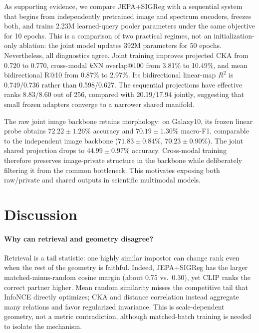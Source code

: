 \documentclass{article}
\begin{document}
As supporting evidence, we compare JEPA+SIGReg with a sequential system that begins from independently pretrained image and spectrum encoders, freezes both, and trains 2.23M learned-query pooler parameters under the same objective for 10 epochs.
This is a comparison of two practical regimes, not an initialization-only ablation: the joint model updates 392M parameters for 50 epochs.
Nevertheless, all diagnostics agree.
Joint training improves projected CKA from 0.720 to 0.770, cross-modal $k$NN overlap@100 from 3.81\% to 10.49\%, and mean bidirectional R@10 from 0.87\% to 2.97\%.
Its bidirectional linear-map $R^2$ is 0.749/0.736 rather than 0.598/0.627.
The sequential projections have effective ranks 8.83/8.60 out of 256, compared with 20.19/17.94 jointly, suggesting that small frozen adapters converge to a narrower shared manifold.

The raw joint image backbone retains morphology: on Galaxy10, its frozen linear probe obtains $72.22\pm1.26$\% accuracy and $70.19\pm1.30$\% macro-F1, comparable to the independent image backbone ($71.83\pm0.84$\%, $70.23\pm0.90$\%).
The joint shared projection drops to $44.99\pm0.97$\% accuracy.
Cross-modal training therefore preserves image-private structure in the backbone while deliberately filtering it from the common bottleneck.
This motivates exposing both raw/private and shared outputs in scientific multimodal models.

\section{Discussion}

\paragraph{Why can retrieval and geometry disagree?}
Retrieval is a tail statistic: one highly similar impostor can change rank even when the rest of the geometry is faithful.
Indeed, JEPA+SIGReg has the larger matched-minus-random cosine margin (about 0.75 vs.\ 0.30), yet CLIP ranks the correct partner higher.
Mean random similarity misses the competitive tail that InfoNCE directly optimizes; CKA and distance correlation instead aggregate many relations and favor regularized invariance.
This is scale-dependent geometry, not a metric contradiction, although matched-batch training is needed to isolate the mechanism.
\end{document}
